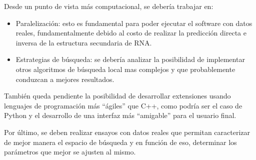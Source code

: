 Desde un punto de vista m\'as computacional, se deber\'ia trabajar en:
\begin{itemize}
 \item Paralelizaci\'on: esto es fundamental para poder ejecutar el
software con datos reales, fundamentalmente debido al costo de realizar la
predicci\'on directa e inversa de la estructura secundaria de \ac{RNA}.
 \item Estrategias de b\'usqueda: se deber\'ia analizar la posibilidad de
implementar otros algoritmos de b\'usqueda local mas complejos y que
probablemente conduzcan a mejores resultados.
\end{itemize}

Tambi\'en queda pendiente la posibilidad de desarrollar extensiones usando
lenguajes de programaci\'on m\'as ``\'agiles'' que C++, como podr\'ia ser el
caso de Python y el desarrollo de una interfaz m\'as ``amigable'' para el
usuario final. 

Por \'ultimo, se deben realizar ensayos con datos reales que permitan
caracterizar de mejor manera el espacio de b\'usqueda y en funci\'on de eso,
determinar los par\'ametros que mejor se ajusten al mismo.
